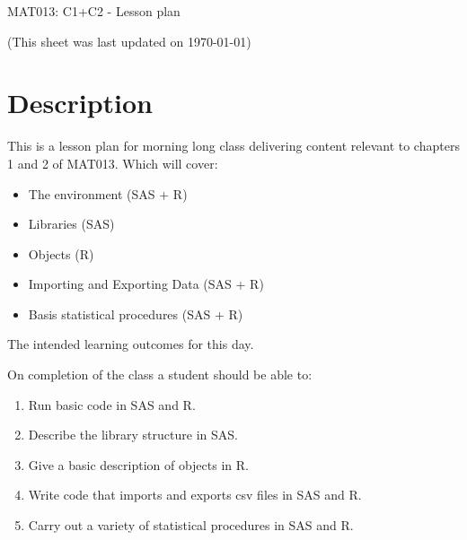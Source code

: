 \documentclass[12pt]{article}
\begin{document}
\begin{center}
\huge{MAT013: C1+C2 - Lesson plan}
\end{center}
\begin{center}
\tiny{(This sheet was last updated on \today)}
\end{center}



\section{Description}

This is a lesson plan for morning long class delivering content relevant to chapters 1 and 2 of MAT013. Which will cover:

\begin{itemize}
\item The environment (SAS + R)
\item Libraries (SAS)
\item Objects (R)
\item Importing and Exporting Data (SAS + R)
\item Basis statistical procedures (SAS + R)
\end{itemize}

The intended learning outcomes for this day.

On completion of the class a student should be able to:

\begin{enumerate}[label=\Alph*]
\item Run basic code in SAS and R.
\item Describe the library structure in SAS.
\item Give a basic description of objects in R.
\item Write code that imports and exports csv files in SAS and R.
\item Carry out a variety of statistical procedures in SAS and R.
\end{enumerate}
\end{document}
